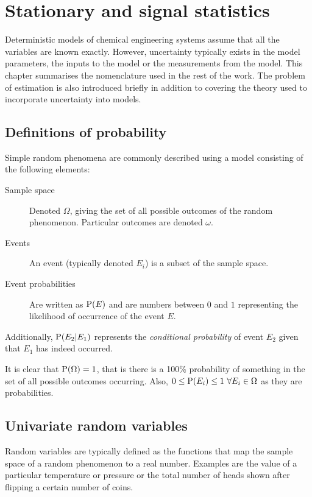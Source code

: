 \chapter{Stationary and signal statistics}\label{chap:stats}
\begin{overview} 
  Deterministic models of chemical engineering systems assume that all the variables are known exactly.
  However, uncertainty typically exists in the model parameters, the inputs to the model or the measurements from the model.
  This chapter summarises the nomenclature used in the rest of the work.
  The problem of estimation is also introduced briefly in addition to covering the theory used to incorporate uncertainty into models.
\end{overview}

\section{Definitions of probability}
\label{sec:statistisc:probability}
Simple random phenomena are commonly described using a model consisting of the following elements:\citep[1]{kulkarni1999modeling}
\begin{description}
\item[Sample space] Denoted $\Omega$, giving the set of all possible outcomes of the random phenomenon.  
  Particular outcomes are denoted $\omega$.
\item[Events] An event (typically denoted $E_i$) is a subset of the sample space.
\item[Event probabilities] Are written as $\mathrm{P}(E)$ and are numbers between $0$ and $1$ representing the likelihood of occurrence of the event $E$.
\end{description}

Additionally, $\mathrm{P}(E_2|E_1)$  represents the \emph{conditional probability} of event $E_2$ given that $E_1$ has indeed occurred.

It is clear that $\mathrm{P}(\Omega)=1$, that is there is a 100\% probability of something in the set of all possible outcomes occurring.
Also, $0 \leq \mathrm{P}(E_i) \leq 1 ~\forall E_i \in \Omega$ as they are probabilities.

\section{Univariate random variables}
\label{sec:univ-rand-vari}
Random variables are typically defined as the functions that map the sample space of a random phenomenon to a real number.
Examples are the value of a particular temperature or pressure or the total number of heads shown after flipping a certain number of coins.

